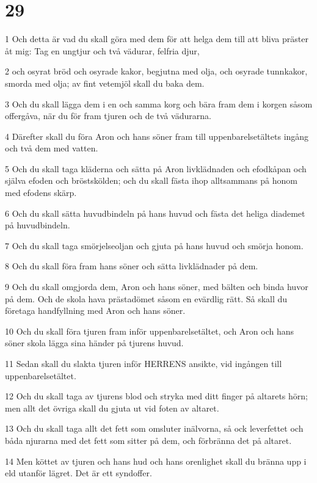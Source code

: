 \chapter{29}

\par 1 Och detta är vad du skall göra med dem för att helga dem till att bliva präster åt mig: Tag en ungtjur och två vädurar, felfria djur,
\par 2 och osyrat bröd och osyrade kakor, begjutna med olja, och osyrade tunnkakor, smorda med olja; av fint vetemjöl skall du baka dem.
\par 3 Och du skall lägga dem i en och samma korg och bära fram dem i korgen såsom offergåva, när du för fram tjuren och de två vädurarna.
\par 4 Därefter skall du föra Aron och hans söner fram till uppenbarelsetältets ingång och två dem med vatten.
\par 5 Och du skall taga kläderna och sätta på Aron livklädnaden och efodkåpan och själva efoden och bröstskölden; och du skall fästa ihop alltsammans på honom med efodens skärp.
\par 6 Och du skall sätta huvudbindeln på hans huvud och fästa det heliga diademet på huvudbindeln.
\par 7 Och du skall taga smörjelseoljan och gjuta på hans huvud och smörja honom.
\par 8 Och du skall föra fram hans söner och sätta livklädnader på dem.
\par 9 Och du skall omgjorda dem, Aron och hans söner, med bälten och binda huvor på dem. Och de skola hava prästadömet såsom en evärdlig rätt. Så skall du företaga handfyllning med Aron och hans söner.
\par 10 Och du skall föra tjuren fram inför uppenbarelsetältet, och Aron och hans söner skola lägga sina händer på tjurens huvud.
\par 11 Sedan skall du slakta tjuren inför HERRENS ansikte, vid ingången till uppenbarelsetältet.
\par 12 Och du skall taga av tjurens blod och stryka med ditt finger på altarets hörn; men allt det övriga skall du gjuta ut vid foten av altaret.
\par 13 Och du skall taga allt det fett som omsluter inälvorna, så ock leverfettet och båda njurarna med det fett som sitter på dem, och förbränna det på altaret.
\par 14 Men köttet av tjuren och hans hud och hans orenlighet skall du bränna upp i eld utanför lägret. Det är ett syndoffer.
